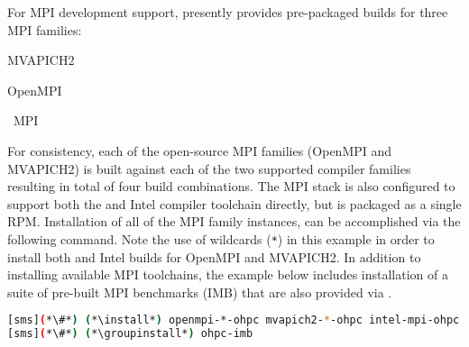 For MPI development support, \OHPC{} presently provides pre-packaged builds for
three MPI families: 

\begin{itemize*}
\item MVAPICH2
\item OpenMPI
\item \Intel{}~MPI

\end{itemize*}
 For consistency, each of the open-source MPI families (OpenMPI and
 MVAPICH2) is built against each of the two supported compiler families
 resulting in total of four build combinations. The \Intel{} MPI stack is also
 configured to support both the \GNU{} and Intel compiler toolchain directly, but
 is packaged as a single RPM. Installation of all of the MPI family instances,
 can be accomplished via the following command. Note the use of wildcards
 (\texttt{*}) in this example in order to install both \GNU{} and Intel builds for
 OpenMPI and MVAPICH2. In addition to installing available MPI toolchains,
 the example below includes installation of a suite of pre-built MPI
 benchmarks (IMB) that are also provided via \OHPC{}.

\begin{lstlisting}[language=bash]
[sms](*\#*) (*\install*) openmpi-*-ohpc mvapich2-*-ohpc intel-mpi-ohpc
[sms](*\#*) (*\groupinstall*) ohpc-imb
\end{lstlisting}
